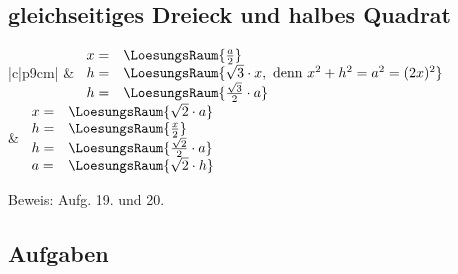 


\begin{samepage}
\subsection{gleichseitiges Dreieck und halbes Quadrat}

\begin{bbwFillInTabular}{|c|p{9cm}|} 
  \hline
   &
  $\begin{array}{ll}
    x=& \LoesungsRaum{\frac{a}{2}}                     \\
    h=& \LoesungsRaum{\sqrt{3}\cdot{}x, \text{ denn } x^2+h^2=a^2=(2x)^2}                \\
    h=& \LoesungsRaum{\frac{\sqrt{3}}{2}\cdot{}a}
  \end{array}$ \\

  \hline
   &
  $\begin{array}{ll}
    x=& \LoesungsRaum{\sqrt{2}\cdot{}a}            \\
    h=& \LoesungsRaum{\frac{x}{2}}                 \\
    h=& \LoesungsRaum{\frac{\sqrt{2}}{2} \cdot{} a}\\
    a=& \LoesungsRaum{\sqrt{2}\cdot{}h}
  \end{array}$ 
  \\
  
  \hline
\end{bbwFillInTabular} 

Beweis: Aufg. 19. und 20. \cite{marthaler20geom}


\end{samepage}

\subsection*{Aufgaben}
\newpage
